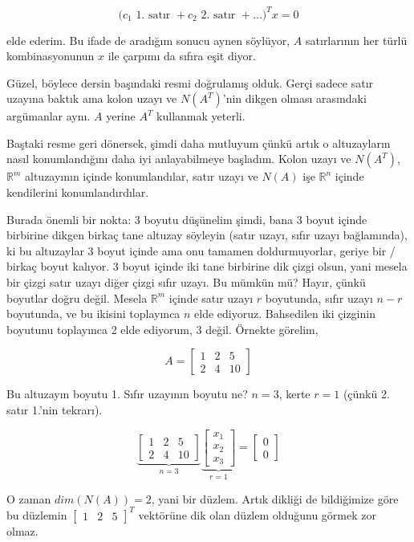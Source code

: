 \documentclass[12pt,fleqn]{article}\usepackage{../../common}
\begin{document}
$$ \big( c_1 \textrm{ 1. satır }  +  c_2 \textrm{ 2. satır } + ... \big)^T x = 0 $$

elde ederim. Bu ifade de aradığım sonucu aynen söylüyor, $A$ satırlarının her
türlü kombinasyonunun $x$ ile çarpımı da sıfıra eşit diyor.

Güzel, böylece dersin başındaki resmi doğrulamış olduk. Gerçi sadece satır
uzayına baktık ama kolon uzayı ve $N(A^T)$'nin dikgen olması arasındaki
argümanlar aynı. $A$ yerine $A^T$ kullanmak yeterli.

Baştaki resme geri dönersek, şimdi daha mutluyum çünkü artık o altuzayların
nasıl konumlandığını daha iyi anlayabilmeye başladım. Kolon uzayı ve $N(A^T)$,
$\mathbb{R}^m$ altuzayının içinde konumlandılar, satır uzayı ve $N(A)$ işe
$\mathbb{R}^n$ içinde kendilerini konumlandırdılar.

Burada önemli bir nokta: 3 boyutu düşünelim şimdi, bana 3 boyut içinde birbirine
dikgen birkaç tane altuzay söyleyin (satır uzayı, sıfır uzayı bağlamında), ki bu
altuzaylar 3 boyut içinde ama onu tamamen doldurmuyorlar, geriye bir / birkaç
boyut kalıyor. 3 boyut içinde iki tane birbirine dik çizgi olsun, yani mesela
bir çizgi satır uzayı diğer çizgi sıfır uzayı. Bu mümkün mü? Hayır, çünkü
boyutlar doğru değil. Mesela $\mathbb{R}^m$ içinde satır uzayı $r$ boyutunda,
sıfır uzayı $n-r$ boyutunda, ve bu ikisini toplayınca $n$ elde
ediyoruz. Bahsedilen iki çizginin boyutunu toplayınca 2 elde ediyorum, 3
değil. Örnekte görelim,

$$ 
A = \left[\begin{array}{rrr}
1 & 2 & 5 \\
2 & 4 & 10
\end{array}\right]
 $$

Bu altuzayın boyutu 1. Sıfır uzayının boyutu ne? $n=3$, kerte $r=1$ (çünkü
2. satır 1.'nin tekrarı). 

$$ 
\underbrace{
\left[\begin{array}{rrr}
1 & 2 & 5 \\
2 & 4 & 10
\end{array}\right]
}_{n=3}
\underbrace{
\left[\begin{array}{r}
x_1 \\ x_2 \\ x_3
\end{array}\right]
}_{r=1}
=
\left[\begin{array}{r}
0 \\ 0
\end{array}\right]
$$

O zaman $dim(N(A))=2$, yani bir düzlem. Artık dikliği de bildiğimize göre bu
düzlemin $\left[\begin{array}{ccc} 1 & 2 & 5 \end{array}\right]^T$ vektörüne dik
olan düzlem olduğunu görmek zor olmaz.
\end{document}

